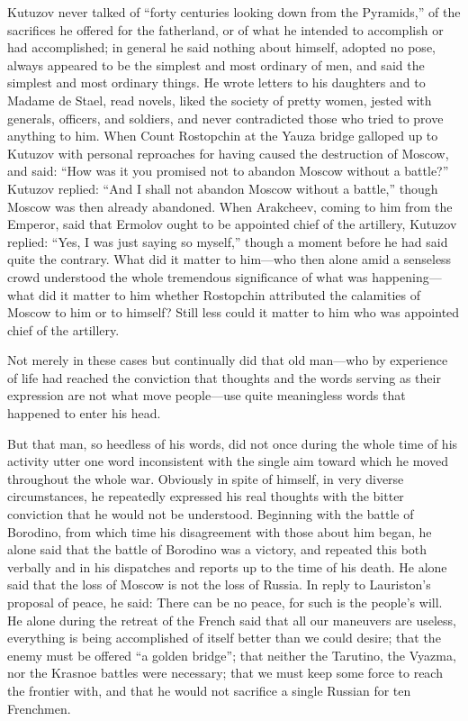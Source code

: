 Kutuzov never talked of ``forty centuries looking down from the
Pyramids,'' of the sacrifices he offered for the fatherland, or
of what he intended to accomplish or had accomplished; in general
he said nothing about himself, adopted no pose, always appeared
to be the simplest and most ordinary of men, and said the
simplest and most ordinary things. He wrote letters to his
daughters and to Madame de Stael, read novels, liked the society
of pretty women, jested with generals, officers, and soldiers,
and never contradicted those who tried to prove anything to
him. When Count Rostopchin at the Yauza bridge galloped up to
Kutuzov with personal reproaches for having caused the
destruction of Moscow, and said: ``How was it you promised not to
abandon Moscow without a battle?'' Kutuzov replied: ``And I shall
not abandon Moscow without a battle,'' though Moscow was then
already abandoned. When Arakcheev, coming to him from the
Emperor, said that Ermolov ought to be appointed chief of the
artillery, Kutuzov replied: ``Yes, I was just saying so myself,''
though a moment before he had said quite the contrary. What did
it matter to him---who then alone amid a senseless crowd
understood the whole tremendous significance of what was
happening---what did it matter to him whether Rostopchin
attributed the calamities of Moscow to him or to himself? Still
less could it matter to him who was appointed chief of the
artillery.

Not merely in these cases but continually did that old man---who
by experience of life had reached the conviction that thoughts
and the words serving as their expression are not what move
people---use quite meaningless words that happened to enter his
head.

But that man, so heedless of his words, did not once during the
whole time of his activity utter one word inconsistent with the
single aim toward which he moved throughout the whole
war. Obviously in spite of himself, in very diverse
circumstances, he repeatedly expressed his real thoughts with the
bitter conviction that he would not be understood.  Beginning
with the battle of Borodino, from which time his disagreement
with those about him began, he alone said that the battle of
Borodino was a victory, and repeated this both verbally and in
his dispatches and reports up to the time of his death. He alone
said that the loss of Moscow is not the loss of Russia. In reply
to Lauriston's proposal of peace, he said: There can be no peace,
for such is the people's will. He alone during the retreat of the
French said that all our maneuvers are useless, everything is
being accomplished of itself better than we could desire; that
the enemy must be offered ``a golden bridge''; that neither the
Tarutino, the Vyazma, nor the Krasnoe battles were necessary;
that we must keep some force to reach the frontier with, and that
he would not sacrifice a single Russian for ten Frenchmen.

